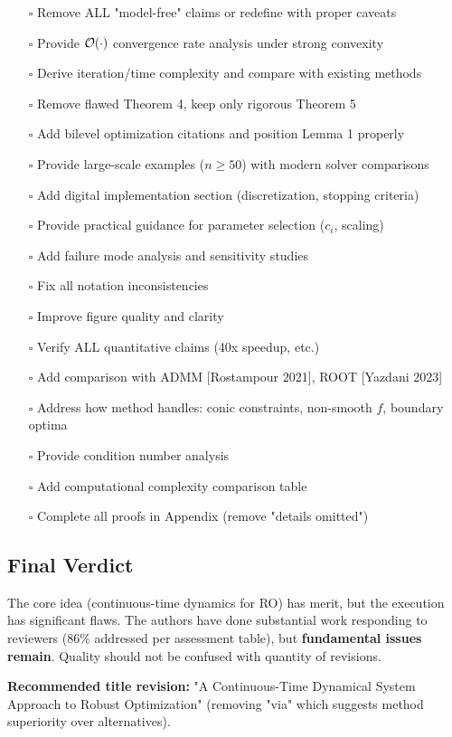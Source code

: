 \documentclass[journal,twoside,web]{ieeecolor}
\begin{document}
\begin{itemize}
\item[$\square$] Remove ALL "model-free" claims or redefine with proper caveats
\item[$\square$] Provide ${\cal O}(\cdot)$ convergence rate analysis under strong convexity
\item[$\square$] Derive iteration/time complexity and compare with existing methods
\item[$\square$] Remove flawed Theorem 4, keep only rigorous Theorem 5
\item[$\square$] Add bilevel optimization citations and position Lemma 1 properly
\item[$\square$] Provide large-scale examples ($n \geq 50$) with modern solver comparisons
\item[$\square$] Add digital implementation section (discretization, stopping criteria)
\item[$\square$] Provide practical guidance for parameter selection ($c_i$, scaling)
\item[$\square$] Add failure mode analysis and sensitivity studies
\item[$\square$] Fix all notation inconsistencies
\item[$\square$] Improve figure quality and clarity
\item[$\square$] Verify ALL quantitative claims (40x speedup, etc.)
\item[$\square$] Add comparison with ADMM [Rostampour 2021], ROOT [Yazdani 2023]
\item[$\square$] Address how method handles: conic constraints, non-smooth $f$, boundary optima
\item[$\square$] Provide condition number analysis
\item[$\square$] Add computational complexity comparison table
\item[$\square$] Complete all proofs in Appendix (remove "details omitted")
\end{itemize}

\subsection*{Final Verdict}

The core idea (continuous-time dynamics for RO) has merit, but the execution has significant flaws. The authors have done substantial work responding to reviewers (86\% addressed per assessment table), but \textbf{fundamental issues remain}. Quality should not be confused with quantity of revisions.

\textbf{Recommended title revision:} "A Continuous-Time Dynamical System Approach to Robust Optimization" (removing "via" which suggests method superiority over alternatives).
\end{document}
